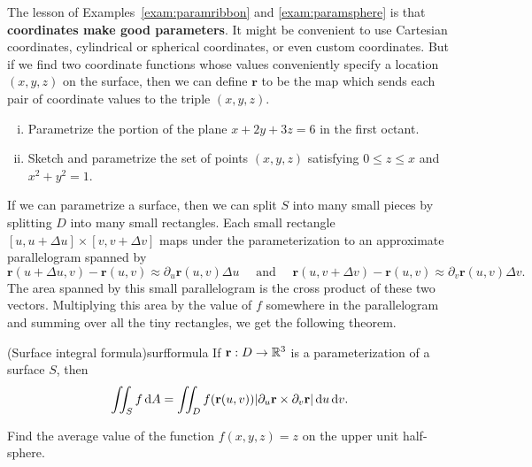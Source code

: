 \documentclass[prettycode,shellescape]{watsonbook}
\begin{document}
The lesson of Examples~\ref{exam:paramribbon} and
\ref{exam:paramsphere} is that \textbf{coordinates make good
  parameters}. It might be convenient to use Cartesian coordinates,
cylindrical or spherical coordinates, or even custom coordinates. But
if we find two coordinate functions whose values conveniently specify
a location $(x,y,z)$ on the surface, then we can define $\mathbf{r}$
to be the map which sends each pair of coordinate values to the triple
$(x,y,z)$.

\begin{exercise}{}{}
  \begin{enumerate}[(i),itemsep=0pt,leftmargin=12pt]
  \item  Parametrize the portion of the plane $x + 2y + 3z = 6$ in the first
    octant. 
  \item  Sketch and parametrize the set of points $(x,y,z)$ satisfying $0 \leq z
    \leq x$ and $x^2 +
    y^2 = 1$.
  \end{enumerate}
\end{exercise}

If we can parametrize a surface, then we can split $S$ into many small
pieces by splitting $D$ into many small rectangles. Each small
rectangle $[u,u+\Delta u] \times [v,v+\Delta v]$ maps under the
parameterization to an approximate parallelogram spanned by
\[
  \mathbf{r}(u+\Delta u, v) - \mathbf{r}(u,v) \approx \partial_u
  \mathbf{r}(u,v) \Delta u  \quad \text{ and } \quad 
  \mathbf{r}(u, v+\Delta v) - \mathbf{r}(u,v) \approx
  \partial_v
  \mathbf{r}(u,v) \Delta v. 
\]
The area spanned by this small parallelogram is the cross product of
these two vectors. Multiplying this area by the value of $f$ somewhere
in the parallelogram and summing over all the tiny rectangles, we get
the following theorem.
\begin{theo}{(Surface integral formula)}{surfformula}
  If $\mathbf{r}:D \to \mathbb{R}^3$ is a parameterization of a surface $S$, then
  \begin{equation} \label{eq:surfformula} 
    \iint_S f \, {\mathrm{d}}A = \iint_D f(\mathbf{r}(u,v)) |\partial_u
    \mathbf{r} \times \partial_v \mathbf{r}| \, {\mathrm{d}}u\,{\mathrm{d}}v. 
  \end{equation}
\end{theo}

\begin{example}{}{}
  Find the average value of the function $f(x,y,z) = z$ on the upper
  unit half-sphere. 
\end{example}
\end{document}
